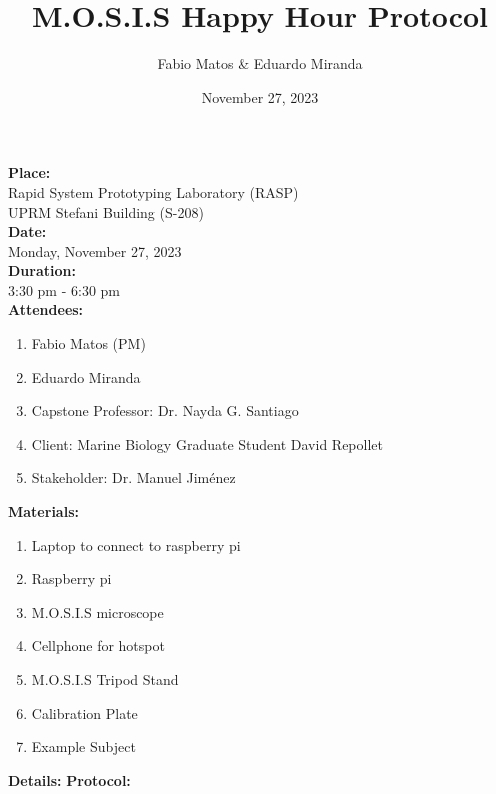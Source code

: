 \documentclass[12pt]{article}
\title{M.O.S.I.S Happy Hour Protocol}
\author{Fabio Matos \& Eduardo Miranda}
\date{November 27, 2023}
\begin{document}
\maketitle
\textbf{Place:} \\
Rapid System Prototyping Laboratory (RASP)\\ UPRM Stefani Building (S-208)\\
\textbf{Date:}\\
Monday, November 27, 2023\\
\textbf{Duration:}\\
3:30 pm - 6:30 pm \\
\textbf{Attendees:}
\begin{enumerate}
    \item Fabio Matos (PM)
    \item Eduardo Miranda
    \item Capstone Professor: Dr. Nayda G. Santiago
    \item Client: Marine Biology Graduate Student David Repollet
    \item Stakeholder: Dr. Manuel Jiménez
\end{enumerate}
\textbf{Materials:}
\begin{enumerate}
    \item Laptop to connect to raspberry pi
    \item Raspberry pi
    \item M.O.S.I.S microscope
    \item Cellphone for hotspot
    \item M.O.S.I.S Tripod Stand
    \item Calibration Plate
    \item Example Subject
\end{enumerate}
\textbf{Details:}
\textbf{Protocol:}
\end{document}
